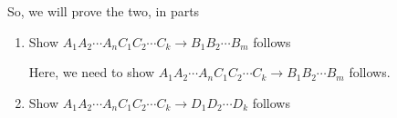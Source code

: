 \documentclass[12pt]{article}
\begin{document}
\begin{enumerate}[1.]
\begin{enumerate}[a)]
\begin{enumerate}[1.]
\begin{mdframed}
                \bigskip

                So, we will prove the two, in parts

                \end{mdframed}

                \bigskip

                \begin{enumerate}[1.]
                    \item Show $A_1A_2 \cdots A_n C_1 C_2 \cdots C_k \to B_1 B_2 \cdots B_m$ follows

                    \begin{mdframed}
                    Here, we need to show $A_1A_2 \cdots A_n C_1 C_2 \cdots C_k \to B_1 B_2 \cdots B_m$ follows.

                    \bigskip




                    \end{mdframed}
                    \item Show $A_1A_2 \cdots A_n C_1 C_2 \cdots C_k \to D_1 D_2 \cdots D_k$ follows
                \end{enumerate}
            \end{enumerate}

        \end{enumerate}
\end{enumerate}
\end{document}
